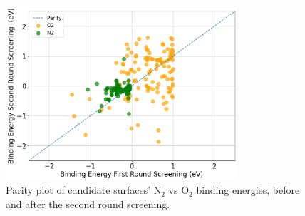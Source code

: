 \begin{figure}[h]
\centering
\includegraphics[width=8.6cm]{figures/metal_oxide_figures/Figure 5.png}
\caption{Parity plot of candidate surfaces' N$_2$ vs O$_2$ binding energies, before and after the second round screening.}
\label{fig:binding_eng_difference}
\end{figure}


